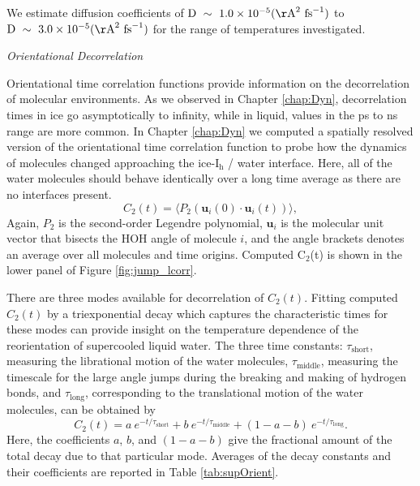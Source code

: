 We estimate diffusion coefficients of
$\mathrm{D}~\sim~ 1.0 \times 10^{-5}
(\mathrm{\AA}^{2}~\mathrm{fs}^{-1})$ to
$\mathrm{D}~\sim~ 3.0 \times 10^{-5}
(\mathrm{\AA}^{2}~\mathrm{fs}^{-1})$ for the range of temperatures
investigated. %


\begin{flushleft}
\textit{Orientational Decorrelation}
\end{flushleft}

Orientational time correlation functions provide information on the
decorrelation of molecular environments. As we observed in Chapter
\ref{chap:Dyn}, decorrelation times in ice go asymptotically to
infinity, while in liquid, values in the ps to ns range are more
common. In Chapter \ref{chap:Dyn} we computed a spatially resolved
version of the orientational time correlation function to probe how
the dynamics of molecules changed approaching the ice-I$_\mathrm{h}$ /
water interface. Here, all of the water molecules should behave
identically over a long time average as there are no interfaces present.
\begin{equation}\label{C(t)}
  C_{2}(t)=\langle P_{2}(\mathbf{u}_i(0)\cdot \mathbf{u}_i(t))\rangle,
\end{equation}
Again, $P_2$ is the second-order Legendre polynomial, 
$\mathbf{u}_i$ is the molecular unit vector that bisects the HOH angle
of molecule $i$, and the angle brackets denotes an average over all
molecules and time origins. Computed C$_2$(t) is shown in the lower
panel of Figure \ref{fig:jump_lcorr}.

There are three modes available for decorrelation of $C_2(t)$. Fitting
computed $C_2(t)$ by a triexponential decay which captures the
characteristic times for these modes can provide insight on the
temperature dependence of the reorientation of supercooled liquid
water. The three time constants: $\tau_\mathrm{short}$, measuring the
librational motion of the water molecules, $\tau_\mathrm{middle}$,
measuring the timescale for the large angle jumps during the breaking
and making of hydrogen bonds, and $\tau_\mathrm{long}$, corresponding
to the translational motion of the water molecules, can be obtained
by\cite{Louden2013a}
\begin{equation}
  C_{2}(t) = a~e^{-t/\tau_\mathrm{short}} + b~e^{-t/\tau_\mathrm{middle}} + 
  (1-a-b)~e^{-t/\tau_\mathrm{long}}.
\label{eq:c2}
\end{equation}
Here, the coefficients $a$, $b$, and $(1-a-b)$ give the fractional
amount of the total decay due to that particular mode. Averages of the
decay constants and their coefficients are reported in Table
\ref{tab:supOrient}.


